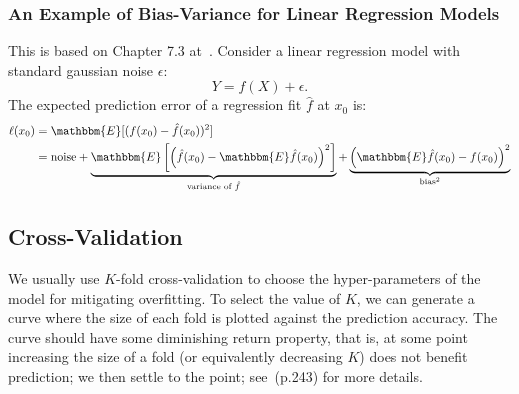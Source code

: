         \subsubsection{An Example of Bias-Variance for Linear Regression Models }
        This is based on Chapter 7.3 at~\cite{hastie2009elements}.
        Consider a linear regression model with standard gaussian noise $\epsilon$:
            \begin{equation}
                Y = f(X) + \epsilon.
            \end{equation}
        The expected prediction error of a regression fit $\hat{f}$ at $x_0$ is:
            \begin{equation}
                \begin{aligned}
                    \ell(x_0) & = \mathbbm{E}[(f(x_0) - \hat{f}(x_0))^2] \\
                    & = \text{noise} + \underbrace{\mathbbm{E}\left[\left(\hat{f}(x_0) - \mathbbm{E}\hat{f}(x_0) \right)^2 \right]}_{\text{variance of $\hat{f}$}} + \underbrace{\left( \mathbbm{E}\hat{f}(x_0) - f(x_0) \right)^2}_{\text{bias}^2}
                \end{aligned}
            \end{equation}
        
        


\subsection{Cross-Validation}
    We usually use $K$-fold cross-validation to choose the hyper-parameters of the model for mitigating overfitting.
    To select the value of $K$, we can generate a curve where the size of each fold is plotted against the prediction accuracy. 
    The curve should have some diminishing return property, that is, at some point increasing the size of a fold (or equivalently decreasing $K$) does not benefit prediction; we then settle to the point; see~\cite{hastie2009elements}(p.243) for more details.



